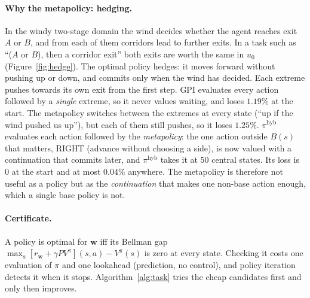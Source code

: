 \documentclass[11pt]{article}
\newcommand{\w}{\mathbf{w}}
\begin{document}
\paragraph{Why the metapolicy: hedging.} In the windy two-stage domain \cite{note} the wind decides whether the agent
reaches exit $A$ or $B$, and from each of them corridors lead to further exits. In a task such as ``($A$ or $B$), then a
corridor exit'' both exits are worth the same in $u_0$ (Figure~\ref{fig:hedge}). The optimal policy hedges: it moves
forward without pushing up or down, and commits only when the wind has decided. Each extreme pushes towards its own exit
from the first step. GPI evaluates every action followed by a \emph{single} extreme, so it never values waiting, and
loses $1.19\%$ at the start. The metapolicy switches between the extremes at every state (``up if the wind pushed us
up''), but each of them still pushes, so it loses $1.25\%$. $\pi^{\mathrm{hyb}}$ evaluates each action followed by the
\emph{metapolicy}: the one action outside $B(s)$ that matters, RIGHT (advance without choosing a side), is now valued
with a continuation that commits later, and $\pi^{\mathrm{hyb}}$ takes it at 50 central states. Its loss is 0 at the
start and at most $0.04\%$ anywhere. The metapolicy is therefore not useful as a policy but as the
\emph{continuation} that makes one non-base action enough, which a single base policy is not.

\paragraph{Certificate.} A policy is optimal for $\w$ iff its Bellman gap $\max_a[r_\w+\gamma PV^\pi](s,a)-V^\pi(s)$
is zero at every state. Checking it costs one evaluation of $\pi$ and one lookahead (prediction, no control), and
policy iteration detects it when it stops. Algorithm~\ref{alg:task} tries the cheap candidates first and only then
improves.
\end{document}
